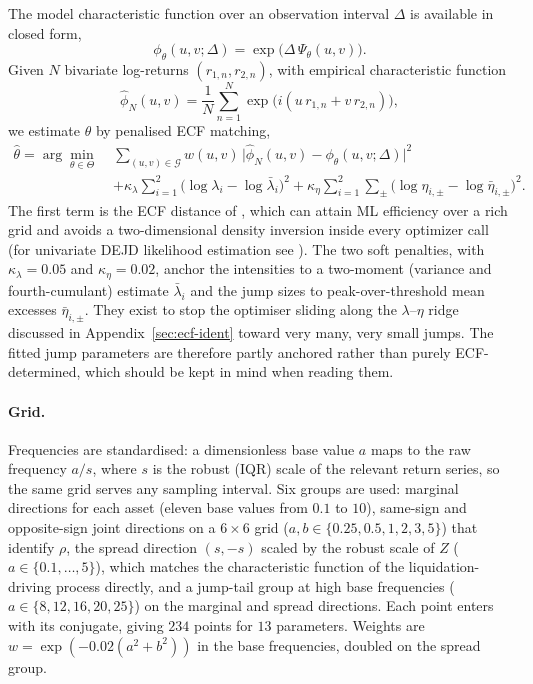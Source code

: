 \documentclass[11pt]{article}
\theoremstyle{plain}
\theoremstyle{definition}
\theoremstyle{remark}
\begin{document}
The model characteristic function over an observation interval $\Delta$ is available in closed form,
\begin{equation}\label{eq:model-cf}
\phi_\theta(u,v;\Delta)
=
\exp\!\bigl(\Delta\,\Psi_\theta(u,v)\bigr).
\end{equation}
Given $N$ bivariate log-returns $(r_{1,n},r_{2,n})$, with empirical characteristic function
\begin{equation}\label{eq:ecf}
\widehat{\phi}_N(u,v)
=
\frac{1}{N}\sum_{n=1}^N
\exp\!\bigl(i(u\,r_{1,n}+v\,r_{2,n})\bigr),
\end{equation}
we estimate $\theta$ by penalised ECF matching,
\begin{equation}\label{eq:ecf-objective}
\begin{aligned}
\widehat{\theta}
=
\arg\min_{\theta\in\Theta}\;
&\sum_{(u,v)\in\mathcal{G}}
w(u,v)
\,\bigl|\widehat{\phi}_N(u,v)-\phi_\theta(u,v;\Delta)\bigr|^2\\
&+\kappa_\lambda\sum_{i=1}^2\bigl(\log\lambda_i-\log\bar\lambda_i\bigr)^2
+\kappa_\eta\sum_{i=1}^2\sum_{\pm}\bigl(\log\eta_{i,\pm}-\log\bar\eta_{i,\pm}\bigr)^2 .
\end{aligned}
\end{equation}
The first term is the ECF distance of \citet{Singleton2001}, which can attain ML efficiency over a
rich grid \citep{FeuervergerMcDunnough1981} and avoids a two-dimensional density inversion inside
every optimizer call (for univariate DEJD likelihood estimation see \citealt{RamezaniZeng2007}). The
two soft penalties, with $\kappa_\lambda=0.05$ and $\kappa_\eta=0.02$, anchor the intensities to a
two-moment (variance and fourth-cumulant) estimate $\bar\lambda_i$ and the jump sizes to
peak-over-threshold mean excesses $\bar\eta_{i,\pm}$. They exist to stop the optimiser sliding along
the $\lambda$--$\eta$ ridge discussed in Appendix~\ref{sec:ecf-ident} toward very many, very small
jumps. The fitted jump parameters are therefore partly anchored rather than purely ECF-determined,
which should be kept in mind when reading them.

\paragraph{Grid.} Frequencies are standardised: a dimensionless base value $a$ maps to the raw
frequency $a/s$, where $s$ is the robust (IQR) scale of the relevant return series, so the same grid
serves any sampling interval. Six groups are used: marginal directions for each asset
(eleven base values from $0.1$ to $10$), same-sign and opposite-sign joint directions on a
$6\times6$ grid ($a,b\in\{0.25,0.5,1,2,3,5\}$) that identify $\rho$, the spread direction $(s,-s)$
scaled by the robust scale of $Z$ ($a\in\{0.1,\ldots,5\}$), which matches the characteristic function
of the liquidation-driving process directly, and a jump-tail group at high base frequencies
($a\in\{8,12,16,20,25\}$) on the marginal and spread directions. Each point enters with its
conjugate, giving $234$ points for $13$ parameters. Weights are $w=\exp(-0.02(a^2+b^2))$ in the
base frequencies, doubled on the spread group.
\end{document}
